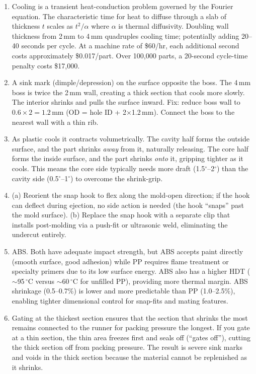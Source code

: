 \documentclass[11pt,letterpaper,twoside,openany]{book}
\providecommand{\ang}[1]{#1\ensuremath{{}^{\circ}}}
\begin{document}
\begin{enumerate}[leftmargin=1.5em]
  \item Cooling is a transient heat-conduction problem governed by the Fourier equation. The characteristic time for heat to diffuse through a slab of thickness $t$ scales as $t^2 / \alpha$ where $\alpha$ is thermal diffusivity. Doubling wall thickness from 2\,mm to 4\,mm quadruples cooling time; potentially adding 20--40 seconds per cycle. At a machine rate of \$60/hr, each additional second costs approximately \$0.017/part. Over 100,000 parts, a 20-second cycle-time penalty costs \$17,000.

  \item A sink mark (dimple/depression) on the surface opposite the boss. The 4\,mm boss is twice the 2\,mm wall, creating a thick section that cools more slowly. The interior shrinks and pulls the surface inward. Fix: reduce boss wall to $0.6 \times 2 = 1.2$\,mm (OD = hole ID + 2$\times$1.2\,mm). Connect the boss to the nearest wall with a thin rib.

  \item As plastic cools it contracts volumetrically. The cavity half forms the outside surface, and the part shrinks \emph{away} from it, naturally releasing. The core half forms the inside surface, and the part shrinks \emph{onto} it, gripping tighter as it cools. This means the core side typically needs more draft (\ang{1.5}--\ang{2}) than the cavity side (\ang{0.5}--\ang{1}) to overcome the shrink-grip.

  \item (a) Reorient the snap hook to flex along the mold-open direction; if the hook can deflect during ejection, no side action is needed (the hook ``snaps'' past the mold surface). (b) Replace the snap hook with a separate clip that installs post-molding via a push-fit or ultrasonic weld, eliminating the undercut entirely.

  \item ABS. Both have adequate impact strength, but ABS accepts paint directly (smooth surface, good adhesion) while PP requires flame treatment or specialty primers due to its low surface energy. ABS also has a higher HDT ($\sim$95\,$^{\circ}$C versus $\sim$60\,$^{\circ}$C for unfilled PP), providing more thermal margin. ABS shrinkage (0.5--0.7\%) is lower and more predictable than PP (1.0--2.5\%), enabling tighter dimensional control for snap-fits and mating features.

  \item Gating at the thickest section ensures that the section that shrinks the most remains connected to the runner for packing pressure the longest. If you gate at a thin section, the thin area freezes first and seals off (``gates off''), cutting the thick section off from packing pressure. The result is severe sink marks and voids in the thick section because the material cannot be replenished as it shrinks.


\end{enumerate}
\end{document}
